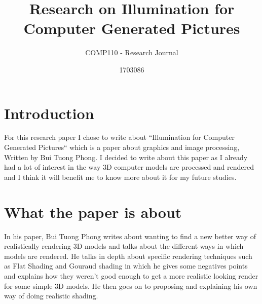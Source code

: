 \documentclass{scrartcl}
\title{Research on Illumination for
Computer Generated
Pictures }
\subtitle{COMP110 - Research Journal}
\author{1703086}
\begin{document}
\maketitle


\section{Introduction}
For this research paper I chose to write about ``Illumination for Computer Generated Pictures`` \cite{one} which is a paper about graphics and image processing, Written by Bui Tuong Phong. I decided to write about this paper as I already had a lot of interest in the way 3D computer models are processed and rendered and I think it will benefit me to know more about it for my future studies. 

\section{What the paper is about}
In his paper, Bui Tuong Phong writes about wanting to find a new better way of realistically rendering 3D models and talks about the different ways in which models are rendered. He talks in depth about specific rendering techniques such as Flat Shading and Gouraud shading in which he gives some negatives points and explains how they weren't good enough to get a more realistic looking render for some simple 3D models. He then goes on to proposing and explaining his own way of doing realistic shading.
\end{document}
